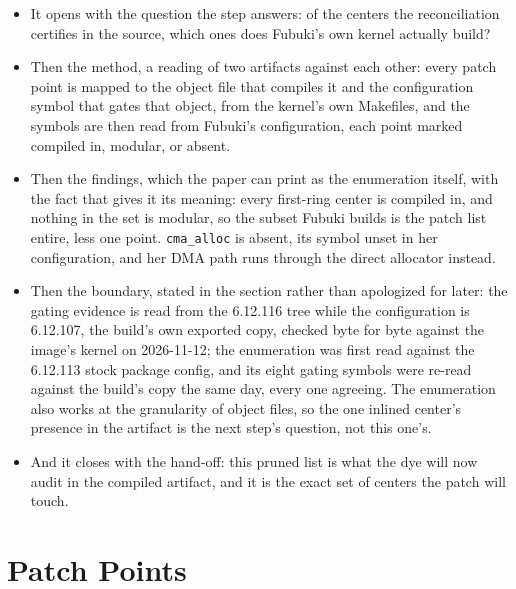 \documentclass[11pt]{article}
\begin{document}
\begin{itemize}
\item It opens with the question the step answers: of the centers the reconciliation certifies in the source, which ones does Fubuki's own kernel actually build?
\item Then the method, a reading of two artifacts against each other: every patch point is mapped to the object file that compiles it and the configuration symbol that gates that object, from the kernel's own Makefiles, and the symbols are then read from Fubuki's configuration, each point marked compiled in, modular, or absent.
\item Then the findings, which the paper can print as the enumeration itself, with the fact that gives it its meaning: every first-ring center is compiled in, and nothing in the set is modular, so the subset Fubuki builds is the patch list entire, less one point. \texttt{cma\_alloc} is absent, its symbol unset in her configuration, and her DMA path runs through the direct allocator instead.
\item Then the boundary, stated in the section rather than apologized for later: the gating evidence is read from the 6.12.116 tree while the configuration is 6.12.107, the build's own exported copy, checked byte for byte against the image's kernel on 2026-11-12; the enumeration was first read against the 6.12.113 stock package config, and its eight gating symbols were re-read against the build's copy the same day, every one agreeing. The enumeration also works at the granularity of object files, so the one inlined center's presence in the artifact is the next step's question, not this one's.
\item And it closes with the hand-off: this pruned list is what the dye will now audit in the compiled artifact, and it is the exact set of centers the patch will touch.
\end{itemize}

\section{Patch Points}
\end{document}
